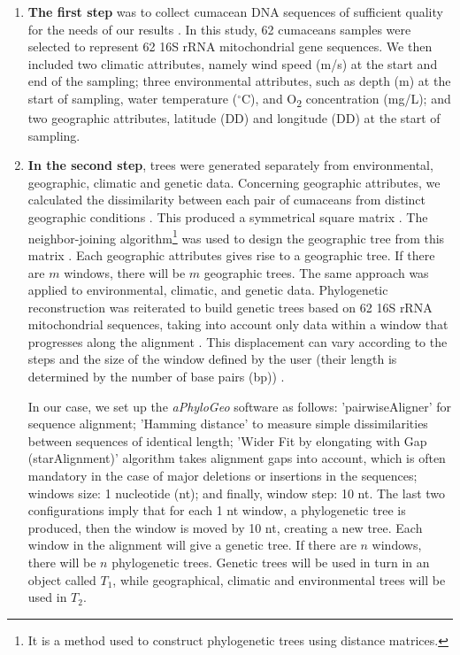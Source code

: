 \begin{enumerate}
\item \textbf{The first step} was to collect cumacean DNA sequences of sufficient quality for the needs of our results \citep{koshkarov_phylogeography_2022}. In this study, 62 cumaceans samples were selected to represent 62 16S rRNA mitochondrial gene sequences. We then included two climatic attributes, namely wind speed (m/s) at the start and end of the sampling; three environmental attributes, such as depth (m) at the start of sampling, water temperature ($^\circ$C), and O\textsubscript{2} concentration (mg/L); and two geographic attributes, latitude (DD) and longitude (DD) at the start of sampling.

\item \textbf{In the second step}, trees were generated separately from environmental, geographic, climatic and genetic data. Concerning geographic attributes, we calculated the dissimilarity between each pair of cumaceans from distinct geographic conditions \citep{koshkarov_phylogeography_2022}. This produced a symmetrical square matrix \citep{koshkarov_phylogeography_2022}. The {neighbor-joining algorithm}\footnote{It is a method used to construct phylogenetic trees using distance matrices.} was used to design the geographic tree from this matrix \citep{koshkarov_phylogeography_2022}. Each geographic attributes gives rise to a geographic tree. If there are $m$ windows, there will be $m$ geographic trees. The same approach was applied to environmental, climatic, and genetic data. Phylogenetic reconstruction was reiterated to build genetic trees based on 62 16S rRNA mitochondrial sequences, taking into account only data within a window that progresses along the alignment \citep{koshkarov_phylogeography_2022}. This displacement can vary according to the steps and the size of the window defined by the user (their length is determined by the number of base pairs (bp)) \citep{koshkarov_phylogeography_2022}. 

In our case, we set up the \textit{aPhyloGeo} software as follows: 'pairwiseAligner' for sequence alignment; 'Hamming distance' to measure simple dissimilarities between sequences of identical length; 'Wider Fit by elongating with Gap (starAlignment)' algorithm takes alignment gaps into account, which is often mandatory in the case of major deletions or insertions in the sequences; windows size: 1 nucleotide (nt); and finally, window step: 10 nt. The last two configurations imply that for each 1 nt window, a phylogenetic tree is produced, then the window is moved by 10 nt, creating a new tree. Each window in the alignment will give a genetic tree. If there are $n$ windows, there will be $n$ phylogenetic trees. Genetic trees will be used in turn in an object called  $T_1$, while geographical, climatic and environmental trees will be used in  $T_2$.


\end{enumerate}
